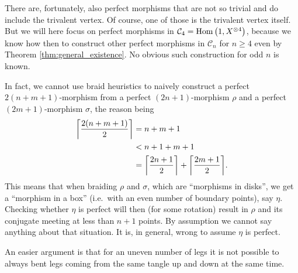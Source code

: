 There are, fortunately, also perfect morphisms that are not so trivial and do include the trivalent vertex. Of course, one of those is the trivalent vertex itself. But we will here focus on perfect morphisms in $\mathcal{C}_4 = \mathrm{Hom}\left( 1, X^{\tensor 4} \right)$, because we know how then to construct other perfect morphisms in $\mathcal{C}_{n}$ for $n\geq 4$ even by \textsf{Theorem \ref{thm:general_existence}}. No obvious such construction for odd $n$ is known.
\begin{remark}
In fact, we cannot use braid heuristics to naively construct a perfect $2(n+m+1)$-morphism from a perfect $(2n+1)$-morphism $\rho$ and a perfect $(2m+1)$-morphism $\sigma$, the reason being
\begin{align*}
\ceil[\bigg]{\frac{2(n+m+1)}{2}} &= n+m +1 \\
&<  n + 1 + m + 1\\
&= \ceil[\bigg]{\frac{2n+1}{2}} + \ceil[\bigg]{\frac{2m+1}{2}}.
\end{align*}
This means that when braiding $\rho$ and $\sigma$, which are ``morphisms in disks'', we get a ``morphism in a box'' (i.e.\ with an even number of boundary points), say $\eta$. Checking whether $\eta$ is perfect will then (for some rotation) result in $\rho$ and its conjugate meeting at less than $n+1$ points. By assumption we cannot say anything about that situation. It is, in general, wrong to assume $\eta$ is perfect.

An easier argument is that for an uneven number of legs it is not possible to always bent legs coming from the same tangle up and down at the same time.
\end{remark}
 

